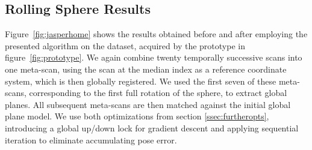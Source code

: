 \subsection{Rolling Sphere Results}

Figure~\ref{fig:jasperhome} shows the results obtained before and after employing the presented algorithm on the dataset, acquired by the prototype in figure~\ref{fig:prototype}.
We again combine twenty temporally successive scans into one meta-scan, using the scan at the median index as a reference coordinate system, which is then globally registered.
We used the first seven of these meta-scans, corresponding to the first full rotation of the sphere, to extract global planes.
All subsequent meta-scans are then matched against the initial global plane model.
We use both optimizations from section \ref{ssec:furtheropts}, introducing a global up/down lock for gradient descent and applying sequential iteration to eliminate accumulating pose error.



